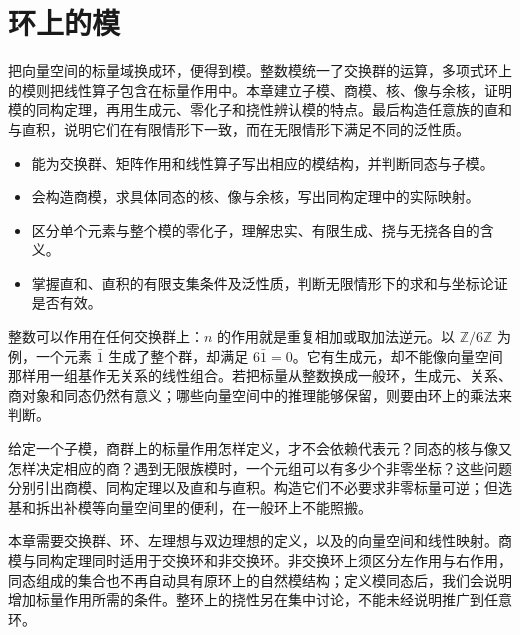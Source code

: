 
\chapter{环上的模}
\label{b2:ch:02}

\begin{chapterabstract}
	把向量空间的标量域换成环，便得到模。整数模统一了交换群的运算，多项式环上的模则把线性算子包含在标量作用中。本章建立子模、商模、核、像与余核，证明模的同构定理，再用生成元、零化子和挠性辨认模的特点。最后构造任意族的直和与直积，说明它们在有限情形下一致，而在无限情形下满足不同的泛性质。
\end{chapterabstract}

\begin{learninggoals}
	\begin{itemize}
		\item 能为交换群、矩阵作用和线性算子写出相应的模结构，并判断同态与子模。
		\item 会构造商模，求具体同态的核、像与余核，写出同构定理中的实际映射。
		\item 区分单个元素与整个模的零化子，理解忠实、有限生成、挠与无挠各自的含义。
		\item 掌握直和、直积的有限支集条件及泛性质，判断无限情形下的求和与坐标论证是否有效。
	\end{itemize}
\end{learninggoals}

整数可以作用在任何交换群上：\(n\) 的作用就是重复相加或取加法逆元。以 \(\mathbb Z/6\mathbb Z\) 为例，一个元素 \(\bar 1\) 生成了整个群，却满足 \(6\bar 1=0\)。它有生成元，却不能像向量空间那样用一组基作无关系的线性组合。若把标量从整数换成一般环，生成元、关系、商对象和同态仍然有意义；哪些向量空间中的推理能够保留，则要由环上的乘法来判断。

\ProseParagraphBreak

给定一个子模，商群上的标量作用怎样定义，才不会依赖代表元？同态的核与像又怎样决定相应的商？遇到无限族模时，一个元组可以有多少个非零坐标？这些问题分别引出商模、同构定理以及直和与直积。构造它们不必要求非零标量可逆；但选基和拆出补模等向量空间里的便利，在一般环上不能照搬。

\ProseParagraphBreak

本章需要交换群、环、左理想与双边理想的定义，以及的向量空间和线性映射。商模与同构定理同时适用于交换环和非交换环。非交换环上须区分左作用与右作用，同态组成的集合也不再自动具有原环上的自然模结构；定义模同态后，我们会说明增加标量作用所需的条件。整环上的挠性另在集中讨论，不能未经说明推广到任意环。

